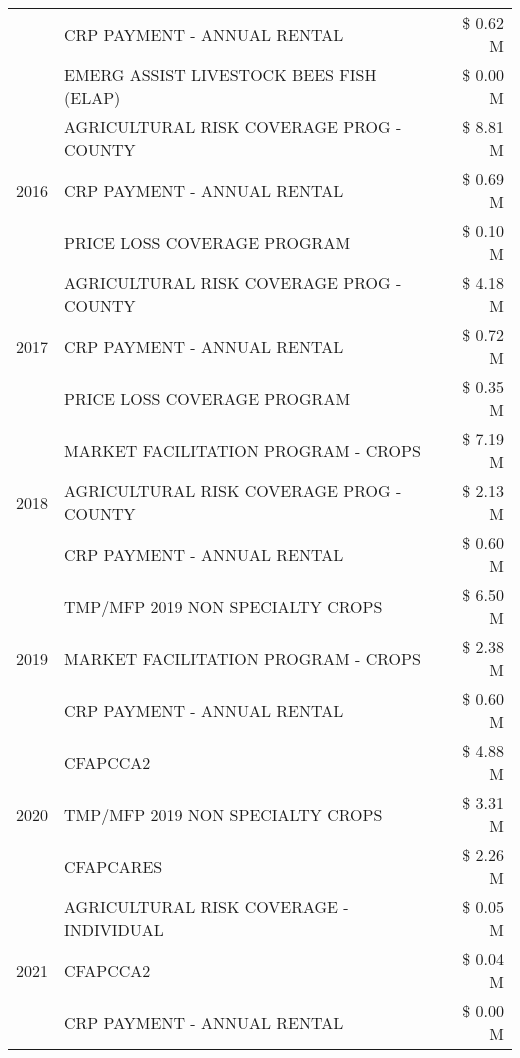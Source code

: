 \begin{tabular}{llr}
 & CRP PAYMENT - ANNUAL RENTAL & \$ 0.62 M \\
 & EMERG ASSIST LIVESTOCK BEES FISH (ELAP) & \$ 0.00 M \\
\cline{1-3}
\multirow[t]{3}{*}{2016} & AGRICULTURAL RISK COVERAGE PROG - COUNTY      & \$ 8.81 M \\
 & CRP PAYMENT - ANNUAL RENTAL                   & \$ 0.69 M \\
 & PRICE LOSS COVERAGE PROGRAM                   & \$ 0.10 M \\
\cline{1-3}
\multirow[t]{3}{*}{2017} & AGRICULTURAL RISK COVERAGE PROG - COUNTY & \$ 4.18 M \\
 & CRP PAYMENT - ANNUAL RENTAL & \$ 0.72 M \\
 & PRICE LOSS COVERAGE PROGRAM & \$ 0.35 M \\
\cline{1-3}
\multirow[t]{3}{*}{2018} & MARKET FACILITATION PROGRAM - CROPS & \$ 7.19 M \\
 & AGRICULTURAL RISK COVERAGE PROG - COUNTY & \$ 2.13 M \\
 & CRP PAYMENT - ANNUAL RENTAL & \$ 0.60 M \\
\cline{1-3}
\multirow[t]{3}{*}{2019} & TMP/MFP 2019 NON SPECIALTY CROPS & \$ 6.50 M \\
 & MARKET FACILITATION PROGRAM - CROPS & \$ 2.38 M \\
 & CRP PAYMENT - ANNUAL RENTAL & \$ 0.60 M \\
\cline{1-3}
\multirow[t]{3}{*}{2020} & CFAPCCA2 & \$ 4.88 M \\
 & TMP/MFP 2019 NON SPECIALTY CROPS & \$ 3.31 M \\
 & CFAPCARES & \$ 2.26 M \\
\cline{1-3}
\multirow[t]{3}{*}{2021} & AGRICULTURAL RISK COVERAGE - INDIVIDUAL & \$ 0.05 M \\
 & CFAPCCA2 & \$ 0.04 M \\
 & CRP PAYMENT - ANNUAL RENTAL & \$ 0.00 M \\
\cline{1-3}
\bottomrule
\end{tabular}
